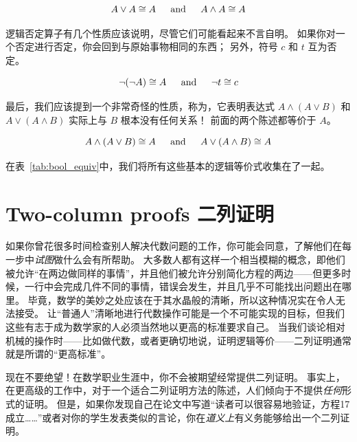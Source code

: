 \[ A \lor A \cong A \mbox{\rule{12pt}{0pt} and \rule{12pt}{0pt}}%
A \land A \cong A \]

逻辑否定算子有几个性质应该说明，尽管它们可能看起来不言自明。
如果你对一个否定进行否定，你会回到与原始事物相同的东西；
另外，符号 $c$ 和 $t$ 互为否定。

\[ \lnot({\lnot}A) \cong A \mbox{\rule{12pt}{0pt} and \rule{12pt}{0pt}}%
{\lnot}t  \cong c \] 

最后，我们应该提到一个非常奇怪的性质，称为，它表明表达式 $A \land (A \lor B)$ 和 $A \lor (A \land B)$ 实际上与 $B$ 根本没有任何关系！
前面的两个陈述都等价于 $A$。

\[ A \land (A \lor B) \cong A \mbox{\rule{12pt}{0pt} and \rule{12pt}{0pt}}%
A \lor (A \land B) \cong A \]

在表~\ref{tab:bool_equiv}中，我们将所有这些基本的逻辑等价式收集在了一起。

\begin{table}[hbt] 
\begin{center}

\end{center} 
\caption{基本逻辑等价式。}
\label{tab:bool_equiv}
\end{table}

\clearpage




\newpage

\section{Two-column proofs 二列证明}
\label{sec:2_col}

如果你曾花很多时间检查别人解决代数问题的工作，你可能会同意，了解他们在每一步中\emph{试图}做什么会有所帮助。
大多数人都有这样一个相当模糊的概念，即他们被允许“在两边做同样的事情”，并且他们被允许分别简化方程的两边——但更多时候，一行中会完成几件不同的事情，错误会发生，并且几乎不可能找出问题出在哪里。
毕竟，数学的美妙之处应该在于其水晶般的清晰，所以这种情况实在令人无法接受。
让“普通人”清晰地进行代数操作可能是一个不可能实现的目标，但我们这些有志于成为数学家的人必须当然地以更高的标准要求自己。
当我们谈论相对机械的操作时——比如做代数，或者更确切地说，证明逻辑等价——二列证明通常就是所谓的“更高标准”。

现在不要绝望！在数学职业生涯中，你不会被期望经常提供二列证明。
事实上，在更高级的工作中，对于一个适合二列证明方法的陈述，人们倾向于不提供\emph{任何}形式的证明。
但是，如果你发现自己在论文中写道“读者可以很容易地验证，方程17成立……”或者对你的学生发表类似的言论，你在\emph{道义上}有义务能够给出一个二列证明。

